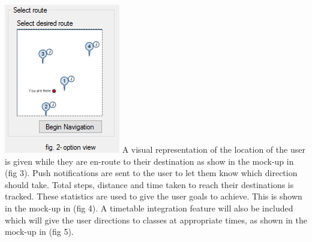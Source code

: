 \documentclass[a4paper,12pt]{article}
\begin{document}
\includegraphics[width=\textwidth]{images/user_two.PNG}
A visual representation of the location of the user is given while they are en-route to their destination as show in the mock-up in (fig 3). Push notifications are sent to the user to let them know which direction should take. Total steps, distance and time taken to reach their destinations is tracked. These statistics are used to give the user goals to achieve. This is shown in the mock-up in (fig 4). A timetable integration feature will also be included which will give the user directions to classes at appropriate times, as shown in the mock-up in (fig 5).
\end{document}
